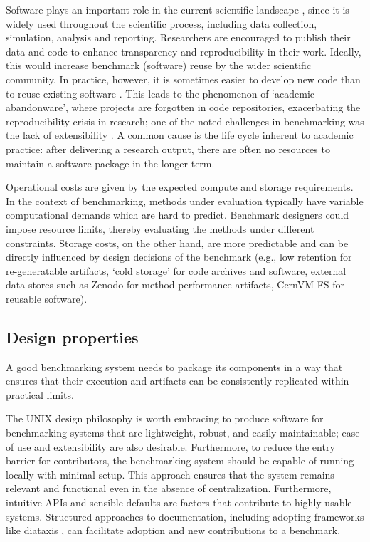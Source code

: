 \documentclass[11pt]{article}
\begin{document}
Software plays an important role in the current scientific landscape \cite{Howison2015-rc}, since it is widely used throughout the scientific process, including data collection, simulation, analysis and reporting. Researchers are encouraged to publish their data and code to enhance transparency and reproducibility in their work. Ideally, this would increase benchmark (software) reuse by the wider scientific community. In practice, however, it is sometimes easier to develop new code than to reuse existing software \cite{Trisovic2022-ol}. This leads to the phenomenon of `academic abandonware', where projects are forgotten in code repositories, exacerbating the reproducibility crisis in research; one of the noted challenges in benchmarking was the lack of extensibility \cite{Sonrel2023-te}. A common cause is the life cycle inherent to academic practice: after delivering a research output, there are often no resources to maintain a software package in the longer term.

Operational costs are given by the expected compute and storage requirements. In the context of benchmarking, methods under evaluation typically have variable computational demands which are hard to predict. Benchmark designers could impose resource limits, thereby evaluating the methods under different constraints. Storage costs, on the other hand, are more predictable and can be directly influenced by design decisions of the benchmark (e.g., low retention for re-generatable artifacts, `cold storage' for code archives and software, external data stores such as Zenodo for method performance artifacts, CernVM-FS for reusable software).

\subsection*{Design properties}

A good benchmarking system needs to package its components in a way that ensures that their execution and artifacts can be consistently replicated within practical limits.

The UNIX design philosophy \cite{Pike1984-we} is worth embracing to produce software for benchmarking systems that are lightweight, robust, and easily maintainable; ease of use and extensibility are also desirable. Furthermore, to reduce the entry barrier for contributors, the benchmarking system should be capable of running locally with minimal setup. This approach ensures that the system remains relevant and functional even in the absence of centralization. Furthermore, intuitive APIs and sensible defaults \cite{Proctor2018-do} are factors that contribute to highly usable systems. Structured approaches to documentation, including adopting frameworks like diataxis \cite{ProcidaUnknown-vf}, can facilitate adoption and new contributions to a benchmark.
\end{document}

